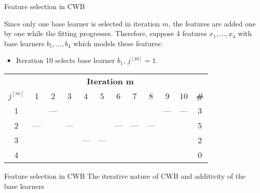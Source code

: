 \begin{vbframe}{Feature selection in CWB}

Since only one base learner is selected in iteration $m$, the features are added one by one while the fitting progresses. Therefore, suppose 4 features $x_1, \dots, x_4$ with base learners $b_1, \dots, b_4$ which models these features:
\begin{itemize}
    \item 
        Iteration 10 selects base learner $b_{1}$, $j^{[10]} = 1$.
\end{itemize}

\begin{table}
  \centering
  \scriptsize
    \begin{tabular}{c|cccccccccc|c}
    \multicolumn{1}{c|}{} & \multicolumn{10}{c}{\bfseries Iteration m} \\ 
    $j^{[m]}$ & 1 & 2 & 3 & 4 & 5 & 6 & 7 & 8 & 9 & 10  & {\bfseries \#} \\ \hline\hline
    1 &     & --- &     &     &     &     &     &     & --- & --- & 3\\
    2 & --- &     & --- &     &     & --- & --- & --- &     &     & 5\\
    3 &     &     &     & --- & --- &     &     &     &     &     & 2\\
    4 &     &     &     &     &     &     &     &     &     &     & 0 
    \end{tabular}
    \addtocounter{framenumber}{-1}
\end{table}

\end{vbframe}

\begin{vbframe}{Feature selection in CWB}
The iterative nature of CWB and additivity of the base learners 
\end{vbframe}

